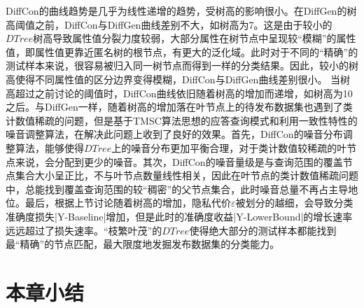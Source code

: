 DiffCon的曲线趋势是几乎为线性递增的趋势，受树高的影响很小。在DiffGen的树高阈值之前，DiffCon与DiffGen曲线差别不大，如树高为7。这是由于较小的$DTree$树高导致属性值分裂力度较弱，大部分属性在树节点中呈现较“模糊”的属性值，即属性值更靠近匿名树的根节点，有更大的泛化域。此时对于不同的“精确”的测试样本来说，很容易被归入同一树节点而得到一样的分类结果。因此，较小的树高使得不同属性值的区分边界变得模糊，DiffCon与DiffGen曲线差别很小。
当树高超过之前讨论的阈值时，DiffCon曲线依旧随着树高的增加而递增，如树高为10之后。与DiffGen一样，随着树高的增加落在叶节点上的待发布数据集也遇到了类计数值稀疏的问题，但是基于TMSC算法思想的应答查询模式和利用一致性特性的噪音调整算法，在解决此问题上收到了良好的效果。首先，DiffCon的噪音分布调整算法，能够使得$DTree$上的噪音分布更加平衡合理，对于类计数值较稀疏的叶节点来说，会分配到更少的噪音。其次，DiffCon的噪音量级是与查询范围的覆盖节点集合大小呈正比，不与叶节点数量线性相关，因此在叶节点的类计数值稀疏问题中，总能找到覆盖查询范围的较“稠密”的父节点集合，此时噪音总量不再占主导地位。最后，根据上节讨论随着树高的增加，隐私代价$\varepsilon$被划分的越细，会导致分类准确度损失|Y-Baseline|增加，但是此时的准确度收益|Y-LowerBound|的增长速率远远超过了损失速率。“枝繁叶茂”的$DTree$使得绝大部分的测试样本都能找到最“精确”的节点匹配，最大限度地发掘发布数据集的分类能力。

\section{本章小结}


